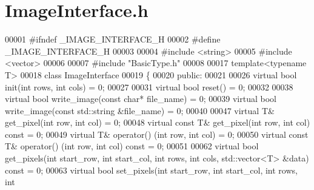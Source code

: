 \section{Image\-Interface.\-h}
\label{_image_interface_8h}

\begin{DoxyCode}
00001 \textcolor{preprocessor}{#ifndef \_IMAGE\_INTERFACE\_H}
00002 \textcolor{preprocessor}{}\textcolor{preprocessor}{#define \_IMAGE\_INTERFACE\_H}
00003 \textcolor{preprocessor}{}
00004 \textcolor{preprocessor}{#include <string>}
00005 \textcolor{preprocessor}{#include <vector>}
00006 
00007 \textcolor{preprocessor}{#include "BasicType.h"}
00008 
00017 \textcolor{keyword}{template}<\textcolor{keyword}{typename} T>
00018 \textcolor{keyword}{class }ImageInterface
00019 \{
00020 \textcolor{keyword}{public}:
00021 
00026         \textcolor{keyword}{virtual} \textcolor{keywordtype}{bool} init(\textcolor{keywordtype}{int} rows, \textcolor{keywordtype}{int} cols) = 0;
00027 
00031         \textcolor{keyword}{virtual} \textcolor{keywordtype}{bool} reset() = 0;
00032 
00038         \textcolor{keyword}{virtual} \textcolor{keywordtype}{bool} write_image(\textcolor{keyword}{const} \textcolor{keywordtype}{char}* file\_name) = 0;
00039         \textcolor{keyword}{virtual} \textcolor{keywordtype}{bool} write_image(\textcolor{keyword}{const} std::string &file\_name) = 0;
00040 
00047         \textcolor{keyword}{virtual} T& get_pixel(\textcolor{keywordtype}{int} row, \textcolor{keywordtype}{int} col) = 0;
00048         \textcolor{keyword}{virtual} \textcolor{keyword}{const} T& get_pixel(\textcolor{keywordtype}{int} row, \textcolor{keywordtype}{int} col) \textcolor{keyword}{const} = 0;
00049         \textcolor{keyword}{virtual} T& operator() (\textcolor{keywordtype}{int} row, \textcolor{keywordtype}{int} col) = 0;
00050         \textcolor{keyword}{virtual} \textcolor{keyword}{const} T& operator() (\textcolor{keywordtype}{int} row, \textcolor{keywordtype}{int} col) \textcolor{keyword}{const} = 0;
00051 
00062         \textcolor{keyword}{virtual} \textcolor{keywordtype}{bool} get_pixels(\textcolor{keywordtype}{int} start\_row, \textcolor{keywordtype}{int} start\_col, \textcolor{keywordtype}{int} rows, \textcolor{keywordtype}{int} 
      cols, std::vector<T> &data) \textcolor{keyword}{const} = 0;
00063         \textcolor{keyword}{virtual} \textcolor{keywordtype}{bool} set\_pixels(\textcolor{keywordtype}{int} start\_row, \textcolor{keywordtype}{int} start\_col, \textcolor{keywordtype}{int} rows, \textcolor{keywordtype}{int} 

\end{DoxyCode}
